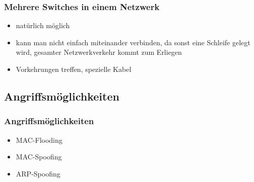 \documentclass{beamer}
\begin{document}
    	\begin{frame}
	       	\frametitle{Mehrere Switches in einem Netzwerk}
	       	\begin{itemize}
	       	\item natürlich möglich
	       	\item kann man nicht einfach miteinander verbinden, da sonst eine Schleife gelegt wird, gesamter Netzwerkverkehr kommt zum Erliegen
	       	\item Vorkehrungen treffen, spezielle Kabel
	       	\end{itemize} 	
	   	\end{frame}
    	
    	\subsection*{Angriffsmöglichkeiten}
        \begin{frame}
        	\frametitle{Angriffsmöglichkeiten}
        	
        	\begin{itemize}
 
        	\item MAC-Flooding
  
        	\item MAC-Spoofing

        	\item ARP-Spoofing
        	\end{itemize}
                       	
    	\end{frame}
    	
\end{document}
